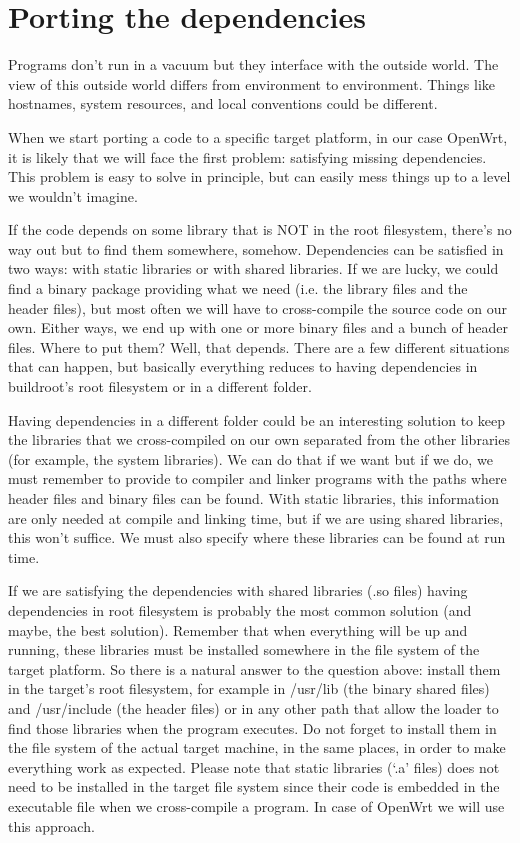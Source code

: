 \chapter{Porting the dependencies}\label{satisfy_dependencies}

Programs don’t run in a vacuum but they interface with the outside world.
The view of this outside world differs from environment to environment.
Things like hostnames, system resources, and local conventions could be different.

When we start porting a code to a specific target platform, in our case OpenWrt, it is likely that we will face the first problem: satisfying missing dependencies.
This problem is easy to solve in principle, but can easily mess things up to a level we wouldn’t imagine.

If the code depends on some library that is NOT in the root filesystem, there’s no way out but to find them somewhere, somehow.
Dependencies can be satisfied in two ways: with static libraries or with shared libraries.
If we are lucky, we could find a binary package providing what we need (i.e. the library files and the header files), but most often we will have to cross-compile the source code on our own.
Either ways, we end up with one or more binary files and a bunch of header files.
Where to put them? Well, that depends.
There are a few different situations that can happen, but basically everything reduces to having dependencies in buildroot's root filesystem or in a different folder.

Having dependencies in a different folder could be an interesting solution to keep the libraries that we cross-compiled on our own separated from the other libraries (for example, the system libraries).
We can do that if we want but if we do, we must remember to provide to compiler and linker programs with the paths where header files and binary files can be found.
With static libraries, this information are only needed at compile and linking time, but if we are using shared libraries, this won’t suffice.
We must also specify where these libraries can be found at run time.

If we are satisfying the dependencies with shared libraries (.so files) having dependencies in root filesystem is probably the most common solution (and maybe, the best solution).
Remember that when everything will be up and running, these libraries must be installed somewhere in the file system of the target platform.
So there is a natural answer to the question above: install them in the target's root filesystem, for example in /usr/lib (the binary shared files) and /usr/include (the header files) or in any other path that allow the loader to find those libraries when the program executes.
Do not forget to install them in the file system of the actual target machine, in the same places, in order to make everything work as expected.
Please note that static libraries (‘.a’ files) does not need to be installed in the target file system since their code is embedded in the executable file when we cross-compile a program.
In case of OpenWrt we will use this approach\cite{fabrizio}.



